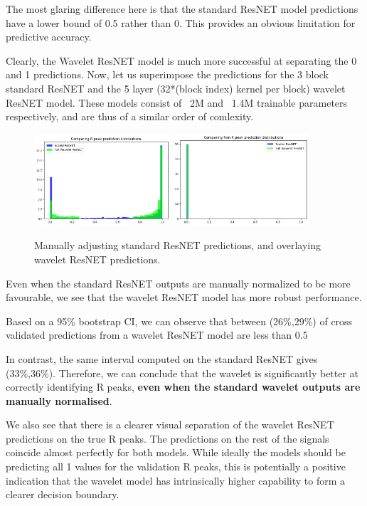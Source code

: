 \documentclass[9pt,conference]{IEEEtran}
\begin{document}
The most glaring difference here is that the standard ResNET model predictions have a lower bound of 0.5 rather than 0. This provides an obvious limitation for predictive accuracy.

Clearly, the Wavelet ResNET model is much more successful at separating the 0 and 1 predictions. Now, let us superimpose the predictions for the 3 block standard ResNET and the 5 layer (32*(block index)  kernel per block) wavelet ResNET model. These models consist of ~2M and ~1.4M trainable parameters respectively, and are thus of a similar order of comlexity.

\begin{figure}[H]
    \centering
    \includegraphics[width=0.45\textwidth]{compRESNETWAVELET.png}
    \includegraphics[width=0.45\textwidth]{compRESNETWAVELET_nonr.png}
    \caption{Manually adjusting standard ResNET predictions, and overlaying wavelet ResNET predictions.}
\end{figure}

Even when the standard ResNET outputs are manually normalized to be more favourable, we see that the wavelet ResNET model has more robust performance.

Based on a 95\% bootstrap CI, we can observe that between (26\%,29\%) of cross validated predictions from a wavelet ResNET model are less than 0.5

In contrast, the same interval computed on the standard ResNET gives (33\%,36\%). Therefore, we can conclude that the wavelet is significantly better at correctly identifying R peaks, \textbf{even when the standard wavelet outputs are manually normalised}.

We also see that there is a clearer visual separation of the wavelet ResNET predictions on the true R peaks. The predictions on the rest of the signals coincide almost perfectly for both models. While ideally the models should be predicting all 1 values for the validation R peaks, this is potentially a positive indication that the wavelet model has intrinsically higher capability to form a clearer decision boundary.
\end{document}

